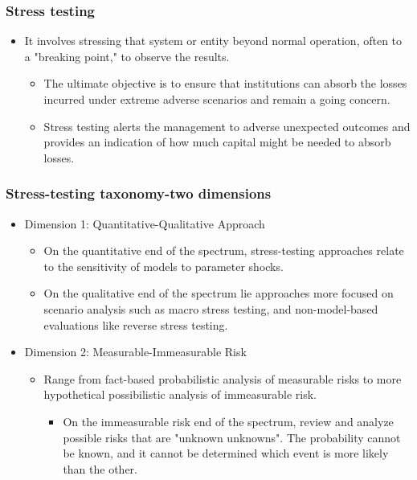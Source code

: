 \subsubsection{Stress testing}
\begin{itemize}
\item It involves stressing that system or entity beyond normal operation, often to a "breaking point," to observe the results.
    \begin{itemize}
    \item The ultimate objective is to ensure that institutions can absorb the losses incurred under extreme adverse scenarios and remain a going concern.
    \item Stress testing alerts the management to adverse unexpected outcomes and provides an indication of how much capital might be needed to absorb losses.
    \end{itemize}
\end{itemize}


\subsubsection{Stress-testing taxonomy-two dimensions}
\begin{itemize}
\item Dimension 1: Quantitative-Qualitative Approach
    \begin{itemize}
    \item On the quantitative end of the spectrum, stress-testing approaches relate to the sensitivity of models to parameter shocks.
    \item On the qualitative end of the spectrum lie approaches more focused on scenario analysis such as macro stress testing, and non-model-based evaluations like reverse stress testing.
    
    \end{itemize}
\item Dimension 2: Measurable-Immeasurable Risk
    \begin{itemize}
    \item Range from fact-based probabilistic analysis of measurable risks to more hypothetical possibilistic analysis of immeasurable risk.
        \begin{itemize}
        \item On the immeasurable risk end of the spectrum, review and analyze possible risks that are "unknown unknowns". The probability cannot be known, and it cannot be determined which event is more likely than the other.
        
        \end{itemize}
        
    \end{itemize}
    
\end{itemize}


